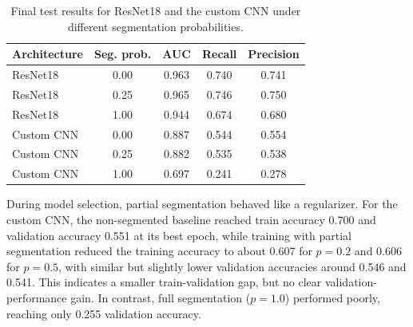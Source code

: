 \documentclass[sigconf, nonacm]{acmart}
\begin{document}
\begin{table}[ht]
	\centering
	\caption{Final test results for ResNet18 and the custom CNN under different segmentation probabilities.}
	\label{tab:final_test_results}
	\begin{tabular}{lcccc}
		\toprule
		Architecture & Seg. prob. & AUC & Recall & Precision \\
		\midrule
		ResNet18 & 0.00    & 0.963 & 0.740 & 0.741 \\
		ResNet18 & 0.25 & 0.965 & 0.746 & 0.750 \\
		ResNet18 & 1.00 & 0.944 & 0.674 & 0.680 \\
		Custom CNN & 0.00    & 0.887 & 0.544 & 0.554 \\
		Custom CNN & 0.25 & 0.882 & 0.535 & 0.538 \\
		Custom CNN & 1.00    & 0.697 & 0.241 & 0.278 \\
		\bottomrule
	\end{tabular}
\end{table}


During model selection, partial segmentation behaved like a regularizer. For the custom CNN, the non-segmented baseline reached train accuracy 0.700 and validation accuracy 0.551 at its best epoch, while training with partial segmentation reduced the training accuracy to about 0.607 for $p=0.2$ and 0.606 for $p=0.5$, with similar but slightly lower validation accuracies around 0.546 and 0.541. This indicates a smaller train-validation gap, but no clear validation-performance gain. In contrast, full segmentation ($p=1.0$) performed poorly, reaching only 0.255 validation accuracy.

%
%
%
%
\end{document}

